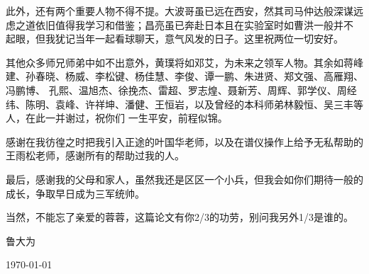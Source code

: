 \begin{thanks}
此外，还有两个重要人物不得不提。大波哥虽已远在西安，然其司马仲达般深谋远虑之道依旧值得我学习和借鉴；昌亮虽已奔赴日本且在实验室时如曹洪一般并不
起眼，但我犹记当年一起看球聊天，意气风发的日子。这里祝两位一切安好。

其他众多师兄师弟中如不出意外，黄璞将如邓艾，为未来之领军人物。其余如蒋峰建、孙春晓、杨威、李松键、杨佳慧、李俊、谭一鹏、朱进贤、郑文强、高雁翔、冯鹏博、
孔熙、温旭杰、徐挽杰、雷超、罗志煌、聂新芳、周辉、郭学仪、周经纬、陈明、袁峰、许祥坤、潘健、王恒岩，以及曾经的本科师弟林毅恒、吴三丰等人，在此一并谢过，祝你们
一生平安，前程似锦。

感谢在我彷徨之时把我引入正途的叶国华老师，以及在谱仪操作上给予无私帮助的王雨松老师，感谢所有的帮助过我的人。

最后，感谢我的父母和家人，虽然我还是区区一个小兵，但我会如你们期待一般的成长，争取早日成为三军统帅。

当然，不能忘了亲爱的蓉蓉，这篇论文有你2/3的功劳，别问我另外1/3是谁的。

\vskip 18pt

\begin{flushright}

鲁大为

\today

\end{flushright}

\end{thanks}

